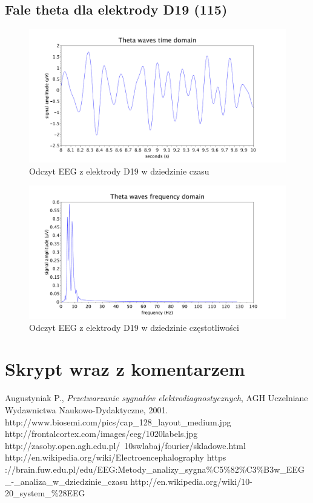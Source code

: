 \documentclass{article}
\begin{document}
    \subsection{Fale theta dla elektrody D19 (115)}
    \begin{figure}[H]
        \hspace*{-1.5cm} 
        \includegraphics[width=\linewidth+3.2cm]{theta_time.pdf}
        \caption{Odczyt EEG z elektrody D19 w dziedzinie czasu}
    \end{figure}
    \begin{figure}[H]
        \hspace*{-1.5cm} 
        \includegraphics[width=\linewidth+3cm]{theta_freq.pdf}
        \caption{Odczyt EEG z elektrody D19 w dziedzinie częstotliwości}
    \end{figure}

\newpage
\section{Skrypt wraz z komentarzem}
\lstset{style=scilab}


\newpage
\begin{thebibliography}{50}
    \bibitem{} Augustyniak P., \emph{Przetwarzanie sygnałów elektrodiagnostycznych}, AGH Uczelniane Wydawnictwa Naukowo-Dydaktyczne, 2001.
    \bibitem{} http://www.biosemi.com/pics/cap\_128\_layout\_medium.jpg
    \bibitem{} http://frontalcortex.com/images/eeg/1020labels.jpg        
    \bibitem{} http://zasoby.open.agh.edu.pl/~10swlabaj/fourier/skladowe.html
    \bibitem{} http://en.wikipedia.org/wiki/Electroencephalography
    \bibitem{} https ://brain.fuw.edu.pl/edu/EEG:Metody\_analizy\_sygna\%C5\%82\%C3\%B3w\_EEG\_-\_analiza\_w\_dziedzinie\_czasu
    \bibitem{} http://en.wikipedia.org/wiki/10-20\_system\_\%28EEG%
\end{thebibliography}

\end{document}
